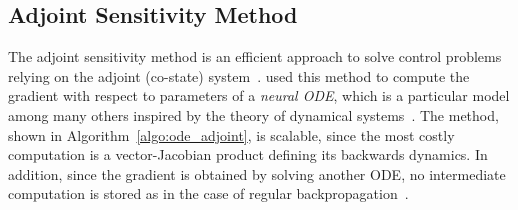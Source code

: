 \documentclass[twoside]{article}
\begin{document}
\subsection{Adjoint Sensitivity Method}
\label{subsec:bg_adjoint_for_odes}
The adjoint sensitivity method is an efficient approach to solve control problems relying on the adjoint (co-state) system~\cite{pontryagin2018mathematical}. 
\citet{chen2018neural} used this method to compute the gradient with respect to parameters of a \emph{neural ODE}, which is a particular model among many others inspired by the theory of dynamical systems~\cite{lu2017beyond,chang2018reversible,ruthotto2018deep,haber2017stable,chang2017multi,li2017maximum,weinan2017proposal}.
The method, shown in Algorithm~\ref{algo:ode_adjoint}, is scalable, since the most costly computation is a vector-Jacobian product defining its backwards dynamics.
In addition, since the gradient is obtained by solving another ODE, no intermediate computation is stored as in the case of regular backpropagation~\cite{rumelhart1988learning}. 
\end{document}
